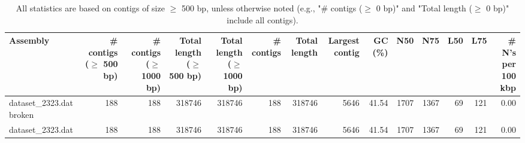 \documentclass[12pt,a4paper]{article}
\begin{document}
\begin{table}[ht]
\begin{center}
\caption{All statistics are based on contigs of size $\geq$ 500 bp, unless otherwise noted (e.g., "\# contigs ($\geq$ 0 bp)" and "Total length ($\geq$ 0 bp)" include all contigs).}
\begin{tabular}{|l*{13}{|r}|}
\hline
Assembly & \# contigs ($\geq$ 500 bp) & \# contigs ($\geq$ 1000 bp) & Total length ($\geq$ 500 bp) & Total length ($\geq$ 1000 bp) & \# contigs & Total length & Largest contig & GC (\%) & N50 & N75 & L50 & L75 & \# N's per 100 kbp \\ \hline
dataset\_2323.dat broken & 188 & 188 & 318746 & 318746 & 188 & 318746 & 5646 & 41.54 & 1707 & 1367 & 69 & 121 & 0.00 \\ \hline
dataset\_2323.dat & 188 & 188 & 318746 & 318746 & 188 & 318746 & 5646 & 41.54 & 1707 & 1367 & 69 & 121 & 0.00 \\ \hline
\end{tabular}
\end{center}
\end{table}
\end{document}
